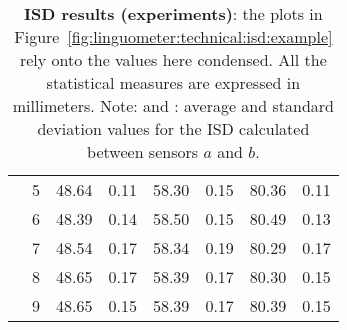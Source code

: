 \begin{table}[htbp]
\begin{center}
\begin{scriptsize}
\begin{tabular}{|c|c|cc|cc|cc|}
		& 5 & 48.64 & 0.11 & 58.30 & 0.15 & 80.36 & 0.11\\
		& 6 & 48.39 & 0.14 & 58.50 & 0.15 & 80.49 & 0.13\\
		& 7 & 48.54 & 0.17 & 58.34 & 0.19 & 80.29 & 0.17\\
		& 8 & 48.65 & 0.17 & 58.39 & 0.17 & 80.30 & 0.15\\
		& 9 & 48.65 & 0.15 & 58.39 & 0.17 & 80.39 & 0.15\\
	  \hline
  \end{tabular}
  \end{scriptsize}
  \end{center}
	\caption[ISD results (experiments)]{\textbf{ISD results (experiments)}: 
	the plots in Figure~\ref{fig:linguometer:technical:isd:example} 
	rely onto the values here condensed. All the statistical measures are
	expressed in millimeters.
	Note:  and : average and standard deviation values for 
	the ISD calculated between sensors $a$ and $b$.}
 \label {tab:linguometer:technical:isd:experiments1}
\end{table}
	

